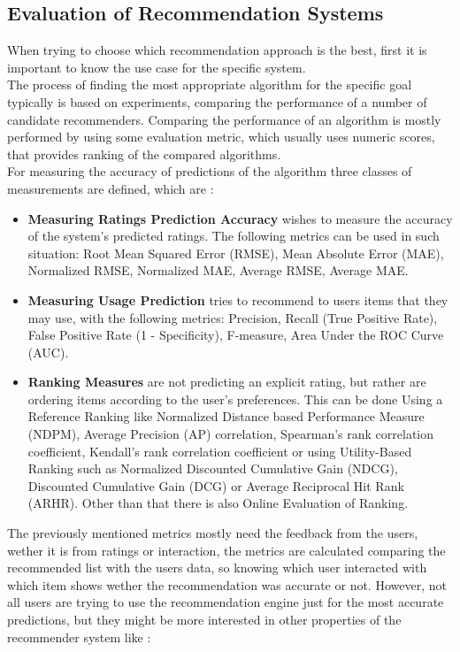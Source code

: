 \documentclass[\myFontSize,a4paper,oneside,hidelinks]{article}
\begin{document}
\subsection{Evaluation of Recommendation Systems}
When trying to choose which recommendation approach is the best, first it is important to know the use case for the specific system. \\
The process of finding the most appropriate algorithm for the specific goal typically is based on experiments, comparing the performance of a number of candidate recommenders. Comparing the performance of an algorithm is mostly performed by using some evaluation metric, which usually uses numeric scores, that provides ranking of the compared algorithms. \\
For measuring the accuracy of predictions of the algorithm three classes of measurements are defined, which are \cite{Gunawardana2022547}:
\begin{itemize}
\item \textbf{Measuring Ratings Prediction Accuracy} wishes to measure the accuracy of the system's predicted ratings. The following metrics can be used in such situation: Root Mean Squared Error (RMSE), Mean Absolute Error (MAE), Normalized RMSE, Normalized MAE, Average RMSE, Average MAE.
\item \textbf{Measuring Usage Prediction} tries to recommend to users items that they may use, with the following metrics: Precision, Recall (True Positive Rate), False Positive Rate (1 - Specificity), F-measure, Area Under the ROC Curve (AUC).
\item \textbf{Ranking Measures} are not predicting an explicit rating, but rather are ordering items according to the user's preferences. This can be done Using a Reference Ranking like Normalized Distance based Performance Measure (NDPM), Average Precision (AP) correlation, Spearman's rank correlation coefficient, Kendall's rank correlation coefficient or using Utility-Based Ranking such as Normalized Discounted Cumulative Gain (NDCG), Discounted Cumulative Gain (DCG) or Average Reciprocal Hit Rank (ARHR). Other than that there is also Online Evaluation of Ranking.
\end{itemize}
%
%
%
The previously mentioned metrics mostly need the feedback from the users, wether it is from ratings or interaction, the metrics are calculated comparing the recommended list with the users data, so knowing which user interacted with which item shows wether the recommendation was accurate or not. However, not all users are trying to use the recommendation engine just for the most accurate predictions, but they might be more interested in other properties of the recommender system like \cite{Gunawardana2022547}:
\end{document}
